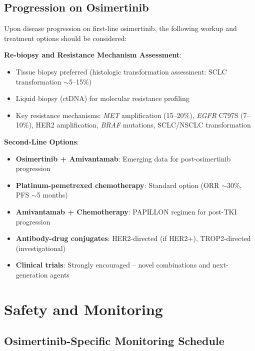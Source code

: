 \documentclass[10pt,letterpaper]{article}
\begin{document}
\subsection{Progression on Osimertinib}

Upon disease progression on first-line osimertinib, the following workup and treatment options should be considered:

\textbf{Re-biopsy and Resistance Mechanism Assessment}:
\begin{itemize}
\item Tissue biopsy preferred (histologic transformation assessment: SCLC transformation $\sim$5--15\%)
\item Liquid biopsy (ctDNA) for molecular resistance profiling
\item Key resistance mechanisms: \textit{MET} amplification (15--20\%), \textit{EGFR} C797S (7--10\%), HER2 amplification, \textit{BRAF} mutations, SCLC/NSCLC transformation
\end{itemize}

\textbf{Second-Line Options}:
\begin{itemize}
\item \textbf{Osimertinib + Amivantamab}: Emerging data for post-osimertinib progression
\item \textbf{Platinum-pemetrexed chemotherapy}: Standard option (ORR $\sim$30\%, PFS $\sim$5 months)
\item \textbf{Amivantamab + Chemotherapy}: PAPILLON regimen for post-TKI progression
\item \textbf{Antibody-drug conjugates}: HER2-directed (if HER2+), TROP2-directed (investigational)
\item \textbf{Clinical trials}: Strongly encouraged -- novel combinations and next-generation agents
\end{itemize}

\section{Safety and Monitoring}

\subsection{Osimertinib-Specific Monitoring Schedule}
\end{document}

